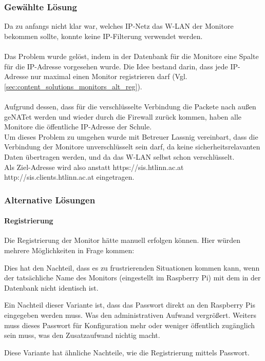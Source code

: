 \subsubsection{Gewählte Lösung}

Da zu anfangs nicht klar war, welches IP-Netz das W-LAN der Monitore bekommen sollte, konnte keine IP-Filterung verwendet werden.\\
\\
Das Problem wurde gelöst, indem in der Datenbank für die Monitore eine Spalte für die IP-Adresse vorgesehen wurde. Die Idee bestand darin, dass jede IP-Adresse nur maximal einen Monitor registrieren darf (Vgl. \autoref{sec:content_solutions_monitors_alt_reg}).\\
\\
Aufgrund dessen, dass für die verschlüsselte Verbindung die Packete nach außen geNATet werden und wieder durch die Firewall zurück kommen, haben alle Monitore die öffentliche IP-Adresse der Schule.\\
Um dieses Problem zu umgehen wurde mit Betreuer Lassnig vereinbart, dass die Verbindung der Monitore unverschlüsselt sein darf, da keine sicherheitsrelavanten Daten übertragen werden, und da das W-LAN selbst schon verschlüsselt.\\
Als Ziel-Adresse wird also anstatt https://sis.htlinn.ac.at http://sis.clients.htlinn.ac.at eingetragen.


\subsubsection{Alternative Lösungen}

\paragraph{Registrierung}
\label{sec:content_solutions_monitors_alt_reg}

Die Registrierung der Monitor hätte manuell erfolgen können. Hier würden mehrere Möglichkeiten in Frage kommen:

\begin{description}[style=nextline]
	\item[Registrierung nur vom Administrator-Interface aus]
		Dies hat den Nachteil, dass es zu frustrierenden Situationen kommen kann, wenn der tatsächliche Name des Monitors (eingestellt im Raspberry Pi) mit dem in der Datenbank nicht identisch ist.\\
	\item[Registrierung mittels Passwort]
		Ein Nachteil dieser Variante ist, dass das Passwort direkt an den Raspberry Pis eingegeben werden muss. Was den administrativen Aufwand vergrößert.
		Weiters muss dieses Passwort für Konfiguration mehr oder weniger öffentlich zugänglich sein muss, was den Zusatzaufwand nichtig macht.
	\item[Registrierung mittels Cookie-Hash]
		Diese Variante hat ähnliche Nachteile, wie die Registrierung mittels Passwort.
\end{description}

